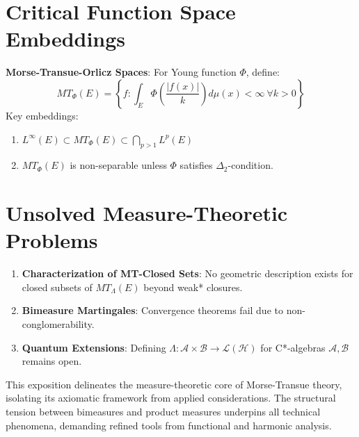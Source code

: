 \documentclass{article}
\begin{document}
\section{Critical Function Space Embeddings}
\textbf{Morse-Transue-Orlicz Spaces}: For Young function $\Phi$, define:
$$
MT_\Phi(E) = \left\{ f : \int_E \Phi\left(\frac{|f(x)|}{k}\right) d\mu(x) < \infty \ \forall k > 0 \right\}
$$
Key embeddings:
\begin{enumerate}
\item $L^\infty(E) \subset MT_\Phi(E) \subset \bigcap_{p>1} L^p(E)$
\item $MT_\Phi(E)$ is non-separable unless $\Phi$ satisfies $\Delta_2$-condition.
\end{enumerate}

\section{Unsolved Measure-Theoretic Problems}
\begin{enumerate}
\item \textbf{Characterization of MT-Closed Sets}: No geometric description exists for closed subsets of $MT_\Lambda(E)$ beyond weak* closures.
\item \textbf{Bimeasure Martingales}: Convergence theorems fail due to non-conglomerability.
\item \textbf{Quantum Extensions}: Defining $\Lambda: \mathcal{A} \times \mathcal{B} \to \mathcal{L}(\mathcal{H})$ for C*-algebras $\mathcal{A}, \mathcal{B}$ remains open.
\end{enumerate}

This exposition delineates the measure-theoretic core of Morse-Transue theory, isolating its axiomatic framework from applied considerations. The structural tension between bimeasures and product measures underpins all technical phenomena, demanding refined tools from functional and harmonic analysis.
\end{document}
